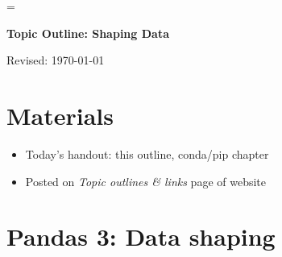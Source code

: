 \documentclass[11pt]{article}
\begin{document}
\parskip=\bigskipamount
\parindent=0.0in
\thispagestyle{empty}


\bigskip\bigskip
\centerline{\Large \bf Topic Outline:  Shaping Data}
\centerline{Revised: \today}

\section*{Materials}

\begin{itemize}
\item  Today's handout:  this outline, conda/pip chapter
\item  Posted on {\it Topic outlines \& links\/} page of website
\end{itemize}


\begin{comment}
\section*{Review}

What's this?
\begin{itemize}
\item
\end{itemize}
\end{comment}


\section*{Pandas 3:  Data shaping}
\end{document}
